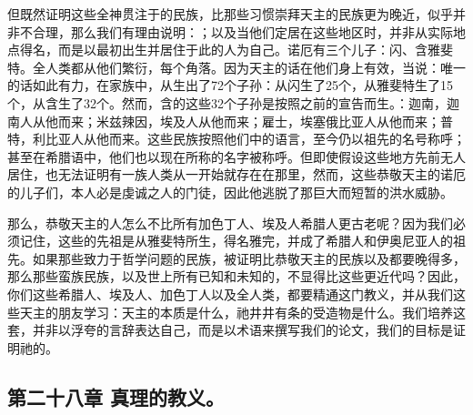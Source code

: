 但既然证明这些全神贯注于的民族，比那些习惯崇拜天主的民族更为晚近，似乎并非不合理，那么我们有理由说明：；以及当他们定居在这些地区时，并非从实际地点得名，而是以最初出生并居住于此的人为自己。诺厄有三个儿子：闪、含雅斐特。全人类都从他们繁衍，每个角落。因为天主的话在他们身上有效，当说：唯一的话如此有力，在家族中，从生出了72个子孙：从闪生了25个，从雅斐特生了15个，从含生了32个。然而，含的这些32个子孙是按照之前的宣告而生。：迦南，迦南人从他而来；米兹辣因，埃及人从他而来；雇士，埃塞俄比亚人从他而来；普特，利比亚人从他而来。这些民族按照他们中的语言，至今仍以祖先的名号称呼；甚至在希腊语中，他们也以现在所称的名字被称呼。但即使假设这些地方先前无人居住，也无法证明有一族人类从一开始就存在在那里，然而，这些恭敬天主的诺厄的儿子们，本人必是虔诚之人的门徒，因此他逃脱了那巨大而短暂的洪水威胁。\par

那么，恭敬天主的人怎么不比所有加色丁人、埃及人希腊人更古老呢？因为我们必须记住，这些的先祖是从雅斐特所生，得名雅完，并成了希腊人和伊奥尼亚人的祖先。如果那些致力于哲学问题的民族，被证明比恭敬天主的民族以及都要晚得多，那么那些蛮族民族，以及世上所有已知和未知的，不显得比这些更近代吗？因此，你们这些希腊人、埃及人、加色丁人以及全人类，都要精通这门教义，并从我们这些天主的朋友学习：天主的本质是什么，祂井井有条的受造物是什么。我们培养这套，并非以浮夸的言辞表达自己，而是以术语来撰写我们的论文，我们的目标是证明祂的。\par


\subsection{第二十八章 真理的教义。}

